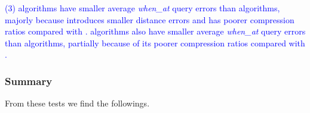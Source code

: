{\ni \textcolor{blue}{(3) \sed algorithms have smaller average \emph{when\_at} query errors than \ped algorithms, majorly because \sed introduces smaller distance errors and has poorer compression ratios compared with \ped. \dad algorithms also have smaller average \emph{when\_at} query errors than \ped algorithms, partially because of its poorer compression ratios compared with \ped. }
	

\subsubsection{Summary}
\label{sec-exp-summary}
From these tests we find the followings.

}
